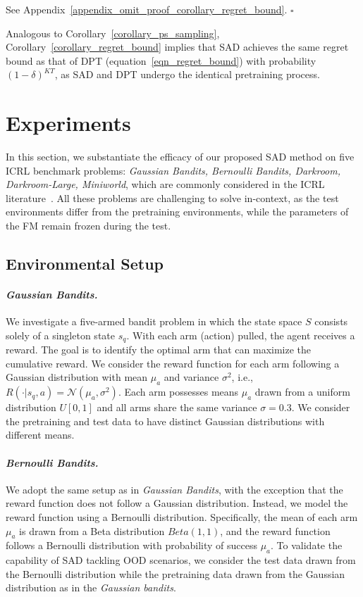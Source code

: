 \documentclass[10pt]{article}
\def\eqref#1{equation~\ref{#1}}
\newenvironment{myproof}{{\noindent\it Proof. }}{\hfill $\square$ \par}
\def\ccalN{{\ensuremath{\mathcal N}}}
\begin{document}
\begin{myproof}
    See Appendix~\ref{appendix_omit_proof_corollary_regret_bound}.
\end{myproof}
Analogous to Corollary~\ref{corollary_ps_sampling}, Corollary~\ref{corollary_regret_bound} implies that SAD achieves the same regret bound as that of DPT (\eqref{eqn_regret_bound}) with probability $(1-\delta)^{KT}$, as SAD and DPT undergo the identical pretraining process.
\section{Experiments}
In this section, we substantiate the efficacy of our proposed SAD method on five ICRL benchmark problems: \textit{Gaussian Bandits, Bernoulli Bandits, Darkroom, Darkroom-Large, Miniworld}, which are commonly considered in the ICRL literature~\citep{laskin2022context, lee2024supervised, dong2024context}.
All these problems are challenging to solve in-context, as the test environments differ from the pretraining environments, while the parameters of the FM  remain frozen during the test.
\subsection{Environmental Setup}
\label{appendix_experiment_detail_env_setup}
\paragraph{\textit{Gaussian Bandits.}}
We investigate a five-armed bandit problem in which the state space $S$ consists solely of a singleton state $s_q$.
With each arm (action) pulled, the agent receives a reward. The goal is to identify the optimal arm that can maximize the cumulative reward.
We consider the reward function for each arm following a Gaussian distribution with mean $\mu_a$ and variance $\sigma^2$, i.e., $R(\cdot | s_q, a) = \ccalN (\mu_a, \sigma^2)$. Each arm possesses means $\mu_a$ drawn from a uniform distribution $U[0, 1]$ and all arms share the same variance $\sigma = 0.3$. We consider the pretraining and test data to have distinct Gaussian distributions with different means.
\paragraph{\textit{Bernoulli Bandits.}}
We adopt the same setup as in \textit{Gaussian Bandits}, with the exception that the reward function does not follow a Gaussian distribution. Instead, we model the reward function using a Bernoulli distribution. Specifically, the mean of each arm $\mu_a$ is drawn from a Beta distribution $\textit{Beta}(1, 1)$, and the reward function follows a Bernoulli distribution with probability of success $\mu_a$. To validate the capability of SAD tackling OOD scenarios, we consider the test data drawn from the Bernoulli distribution while the pretraining data drawn from the Gaussian distribution as in the \textit{Gaussian bandits}.
\end{document}
